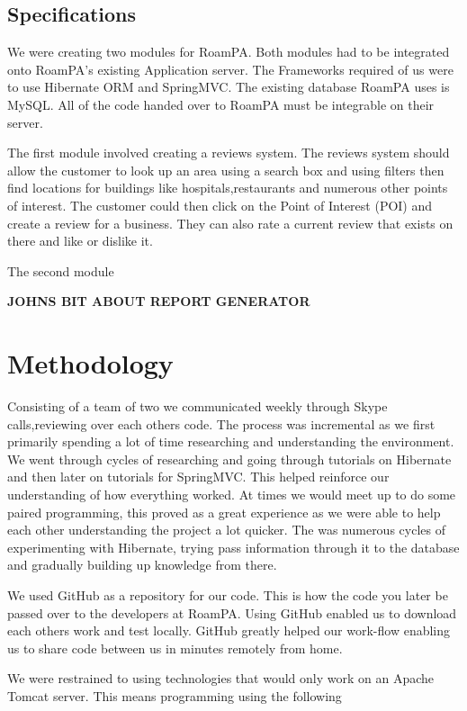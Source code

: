 \section{Specifications}

We were creating two modules for RoamPA. Both modules had to be integrated onto RoamPA's existing Application server. The Frameworks required of us were to use Hibernate ORM and SpringMVC. The existing database RoamPA uses is MySQL. All of the code handed over to RoamPA must be integrable on their server.

The first module involved creating a reviews system. The reviews system should allow the customer to look up an area using a search box and using filters then find locations for buildings like hospitals,restaurants and numerous other points of interest. The customer could then click on the Point of Interest (POI) and create a review for a business. They can also rate a current review that exists on there and like or dislike it.

The second module \newline

\textbf{JOHNS BIT ABOUT REPORT GENERATOR}


\chapter{Methodology}

Consisting of a team of two we communicated weekly through Skype calls,reviewing over each others code. The process was incremental as we first primarily spending a lot of time researching and understanding the environment. We went through cycles of researching and going through tutorials on Hibernate and then later on tutorials for SpringMVC. This helped reinforce our understanding of how everything worked. At times we would meet up to do some paired programming, this proved as a great experience as we were able to help each other understanding the project a lot quicker. The was numerous cycles of experimenting with Hibernate, trying pass information through it to the database and gradually building up knowledge from there. 

We used GitHub as a repository for our code. This is how the code you later be passed over to the developers at RoamPA. Using GitHub enabled us to download each others work and test locally. GitHub greatly helped our work-flow enabling us to share code between us in minutes remotely from home.

We were restrained to using technologies that would only work on an Apache Tomcat server. This means programming using the following

